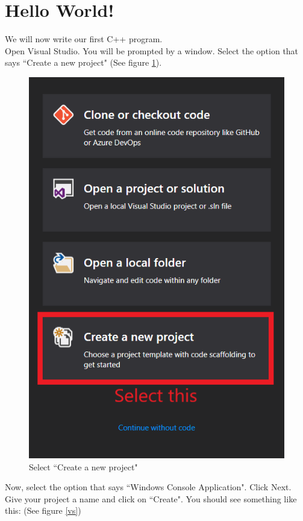 \documentclass[letterpaper, 12pt]{book}
\begin{document}
\section{Hello World!}
We will now write our first C++ program.\\
Open Visual Studio. You will be prompted by a window. Select the option that says ``Create a new project" (See figure \ref{new_proj}).
\begin{figure}[h]
\centering
\includegraphics[scale=0.6]{img/new_proj}
\caption{Select ``Create a new project"}\label{new_proj}
\end{figure}
Now, select the option that says ``Windows Console Application". Click Next. Give your project a name and click on ``Create".
You should see something like this: (See figure \ref{vs})
\end{document}
